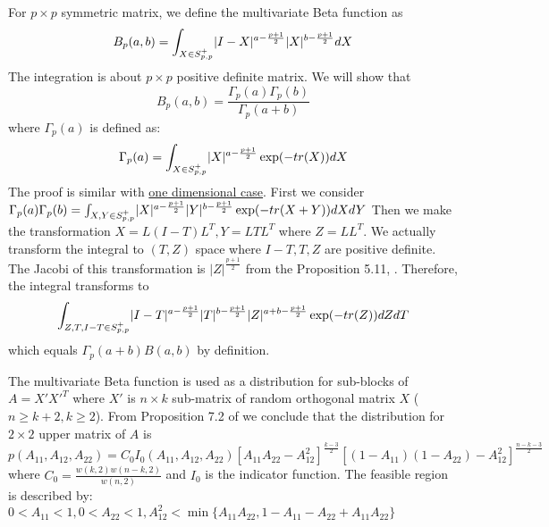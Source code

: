 \documentclass{article}
\DeclarePairedDelimiter\abs{\lvert}{\rvert}
\begin{document}
For $p \times p$ symmetric matrix, we define the multivariate Beta function
as 
\begin{equation}
B_p(a, b) = \int_{X \in S_{p,p}^{+} }\abs{I-X}^{a-\frac{p+1}{2}} \abs{X}^{b-\frac{p+1}{2}}dX
\end{equation}
The integration is about $p \times p$ positive definite matrix. We will show that
\begin{equation}
B_p(a,b) = \frac{\Gamma_p(a)\Gamma_p(b)}{\Gamma_p(a+b)}
\end{equation}
where $\Gamma_p(a)$ is defined as:
\begin{equation}
\Gamma_p(a) =  \int_{X \in S_{p,p}^{+} }\abs{X}^{a-\frac{p+1}{2}} \exp(-tr(X))dX
\end{equation}
The proof is similar with \href{https://en.wikipedia.org/wiki/Beta_function#Relationship_between_gamma_function_and_beta_function}{one dimensional case}. 
First we consider 
$\Gamma_p(a)\Gamma_p(b) = \int_{X,Y \in S_{p,p}^{+} }\abs{X}^{a-\frac{p+1}{2}} \abs{Y}^{b-\frac{p+1}{2}}\exp(-tr(X+Y))dXdY$
Then we make the transformation $X = L(I-T)L^T, Y=LTL^T$ where $Z=LL^T$. We actually transform  the integral to $(T,Z)$ space where $I-T, T,Z$ are positive definite.
The Jacobi of this transformation is $|Z|^{\frac{p+1}{2}}$ from the Proposition 5.11, \cite{eaton}. Therefore, the integral transforms to
$$
\int_{Z,T, I-T \in S_{p,p}^{+} }\abs{I-T}^{a-\frac{p+1}{2}} \abs{T}^{b-\frac{p+1}{2}}\abs{Z}^{a+b-\frac{p+1}{2}}\exp(-tr(Z))dZdT
$$ which equals $\Gamma_p(a+b)B(a,b)$ by definition.

The multivariate Beta function is used as a distribution for sub-blocks of $A=X'X'^T$ where $X'$ is $n \times k$ sub-matrix of random orthogonal matrix $X$ ($n\geq k+2, k\geq 2$). From Proposition 7.2 of \cite{eaton1989group} we conclude that the distribution for $2\times 2$ upper matrix of $A$ is 
\begin{equation}
p(A_{11}, A_{12}, A_{22}) = C_0 I_0(A_{11}, A_{12}, A_{22})[A_{11}A_{22}-A_{12}^2]^{\frac{k-3}{2}} [(1-A_{11})(1-A_{22})-A_{12}^2]^{\frac{n-k-3}{2}}
\end{equation}
where $C_0 = \frac{w(k, 2) w(n-k, 2)}{w(n, 2)}$ and $I_0$ is the indicator function. The feasible region is described by:
$ 0 < A_{11} < 1, 0 < A_{22} < 1, A_{12}^2 < \min\{A_{11}A_{22}, 1 - A_{11} - A_{22} + A_{11}A_{22}\}$


\end{document}
